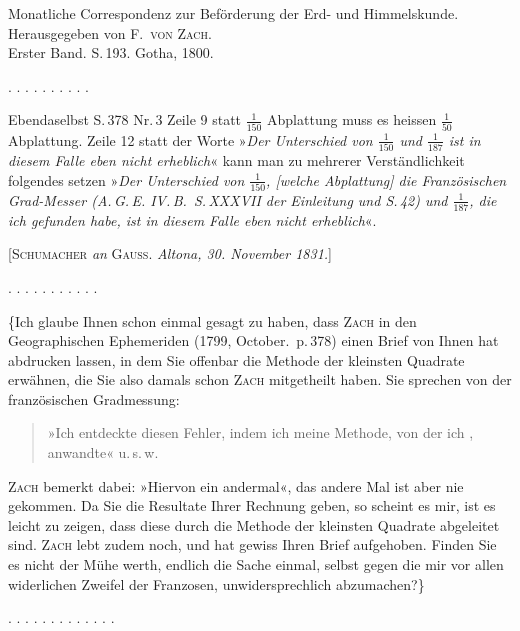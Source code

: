\clearpage
{}
\begin{center}
Monatliche Correspondenz zur Beförderung der Erd- und Himmelskunde. Herausgegeben von F.\ \textsc{von Zach}.\\
Erster Band. S.\,193. Gotha, 1800.
\end{center}

\begin{center}
\end{center}

\begin{center}
. . . . . . . . . .
\end{center}

Ebendaselbst S.\,378 Nr.\,3 Zeile 9 statt $\frac{1}{150}$ Abplattung muss es heissen $\frac{1}{50}$ Abplattung. Zeile 12 statt der Worte »\emph{Der Unterschied von $\frac{1}{150}$ und $\frac{1}{187}$ ist in diesem Falle eben nicht erheblich}« kann man zu mehrerer Verständlichkeit folgendes setzen »\emph{Der Unterschied von $\frac{1}{150}$, [welche Abplattung] die Französischen Grad-Messer (A.\,G.\,E. IV.\,B.\ S.\,XXXVII der Einleitung und S.\,42) und $\frac{1}{187}$, die ich gefunden habe, ist in diesem Falle eben nicht erheblich}«.

\bigskip
\begin{center}
[\textsc{Schumacher} \emph{an} \textsc{Gauss}. \emph{Altona, 30. November 1831.}]
\end{center}

\begin{center}
. . . . . . . . . . .
\end{center}

\{Ich glaube Ihnen schon einmal gesagt zu haben, dass \textsc{Zach} in den Geographischen Ephemeriden (1799, October.\ p.\,378) einen Brief von Ihnen hat abdrucken lassen, in dem Sie offenbar die Methode der kleinsten Quadrate erwähnen, die Sie also damals schon \textsc{Zach} mitgetheilt haben. Sie sprechen von der französischen Gradmessung:

\begin{quote}
»Ich entdeckte diesen Fehler, indem ich meine Methode, von der ich , anwandte« u.\,s.\,w.
\end{quote}

\textsc{Zach} bemerkt dabei: »Hiervon ein andermal«, das andere Mal ist aber nie gekommen. Da Sie die Resultate Ihrer Rechnung geben, so scheint es mir, ist es leicht zu zeigen, dass diese durch die Methode der kleinsten Quadrate abgeleitet sind. \textsc{Zach} lebt zudem noch, und hat gewiss Ihren Brief aufgehoben. Finden Sie es nicht der Mühe werth, endlich die Sache einmal, selbst gegen die mir vor allen widerlichen  Zweifel der Franzosen, unwidersprechlich abzumachen?\}

\begin{center}
. . . . . . . . . . . . .
\end{center}
